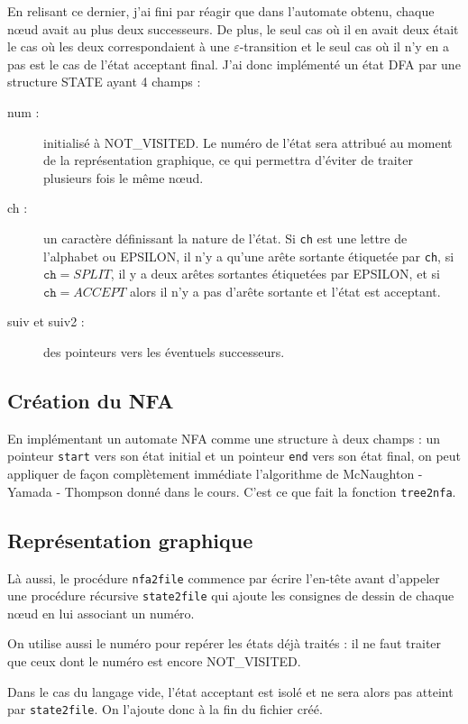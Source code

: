\documentclass[12pt, a4paper]{article}
\begin{document}
En relisant ce dernier, j'ai fini par réagir que dans l'automate obtenu, chaque nœud avait au plus deux successeurs. De plus, le seul cas où il en avait deux était le cas où les deux correspondaient à une $\varepsilon$-transition et le seul cas où il n'y en a pas est le cas de l'état acceptant final. J'ai donc implémenté un état DFA par une structure STATE ayant 4 champs :
\begin{description}
\item[num :] initialisé à NOT\_VISITED. Le numéro de l'état sera attribué au moment de la représentation graphique, ce qui permettra d'éviter de traiter plusieurs fois le même nœud.
\item[ch :] un caractère définissant la nature de l'état. Si \texttt{ch} est une lettre de l'alphabet ou EPSILON, il n'y a qu'une arête sortante étiquetée par \texttt{ch}, si $\texttt{ch}=SPLIT$, il y a deux arêtes sortantes étiquetées par EPSILON, et si $\texttt{ch}=ACCEPT$ alors il n'y a pas d'arête sortante et l'état est acceptant.
\item[suiv et suiv2 : ] des pointeurs vers les éventuels successeurs.
\end{description}

\subsection{Création du NFA}

En implémentant un automate NFA comme une structure à deux champs : un pointeur \texttt{start} vers son état initial et un pointeur \texttt{end} vers son état final, on peut appliquer de façon complètement immédiate l'algorithme de McNaughton - Yamada - Thompson donné dans le cours. C'est ce que fait la fonction \texttt{tree2nfa}.

\subsection{Représentation graphique}

Là aussi, le procédure \texttt{nfa2file} commence par écrire l'en-tête avant d'appeler une procédure récursive \texttt{state2file} qui ajoute les consignes de dessin de chaque nœud en lui associant un numéro.

On utilise aussi le numéro pour repérer les états déjà traités : il ne faut traiter que ceux dont le numéro est encore NOT\_VISITED.

Dans le cas du langage vide, l'état acceptant est isolé et ne sera alors pas atteint par \texttt{state2file}. On l'ajoute donc à la fin du fichier créé.
\end{document}
